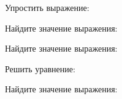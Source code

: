 \begin{enumcols}[label=\textbf{\arabic*.}]
	\item Упростить выражение:
	\begin{enumcols}[itemcolumns=3]
		\item {}
		\item {}
		\item {}
	\end{enumcols}
	\item Найдите значение выражения:
	\begin{enumcols}[itemcolumns=2]
		\item {}
		\item {}
	\end{enumcols}
	\item {}
	\item {}
	\item Найдите значение выражения:
	\begin{enumcols}[itemcolumns=4]
		\item {}
		\item {}
		\item {}
		\item {}
	\end{enumcols}
	\item Решить уравнение:
	\begin{enumcols}[itemcolumns=3]
		\item {}
		\item {}
		\item {}
	\end{enumcols}
	\item Найдите значение выражения:
	\begin{enumcols}[itemcolumns=3]
		\item {}
		\item {}
		\item {}
	\end{enumcols}
	\item {}
	\item {}
	\item {}
	\item {}
	\item {}
	\item {}
\end{enumcols}